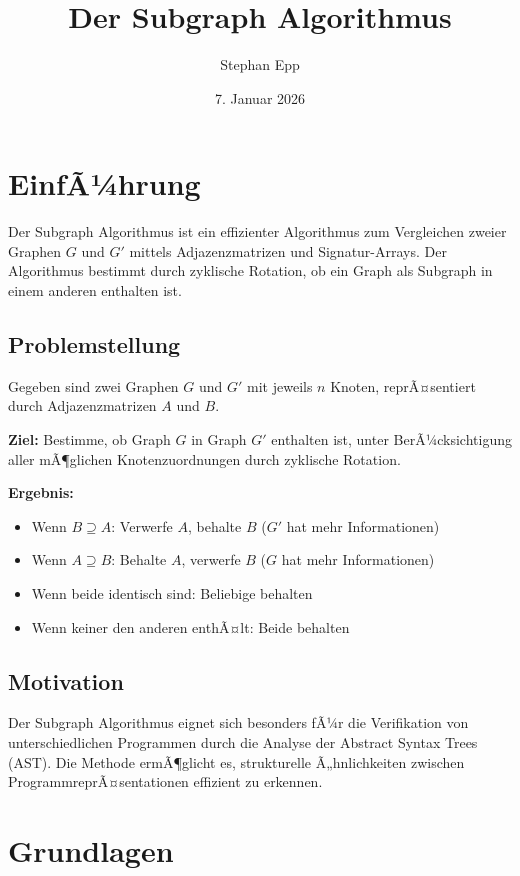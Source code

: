 ﻿\documentclass[a4paper,12pt]{article}
\title{Der Subgraph Algorithmus}
\author{Stephan Epp}
\date{7. Januar 2026}
\theoremstyle{definition}
\begin{document}
	
\maketitle

\tableofcontents
\newpage

\section{EinfÃ¼hrung}

Der Subgraph Algorithmus ist ein effizienter Algorithmus zum Vergleichen zweier Graphen $G$ und $G'$ mittels Adjazenzmatrizen und Signatur-Arrays. Der Algorithmus bestimmt durch zyklische Rotation, ob ein Graph als Subgraph in einem anderen enthalten ist.

\subsection{Problemstellung}

Gegeben sind zwei Graphen $G$ und $G'$ mit jeweils $n$ Knoten, reprÃ¤sentiert durch Adjazenzmatrizen $A$ und $B$.

\textbf{Ziel:} Bestimme, ob Graph $G$ in Graph $G'$ enthalten ist, unter BerÃ¼cksichtigung aller mÃ¶glichen Knotenzuordnungen durch zyklische Rotation.

\textbf{Ergebnis:}
\begin{itemize}
	\item Wenn $B \supseteq A$: Verwerfe $A$, behalte $B$ ($G'$ hat mehr Informationen)
	\item Wenn $A \supseteq B$: Behalte $A$, verwerfe $B$ ($G$ hat mehr Informationen)
	\item Wenn beide identisch sind: Beliebige behalten
	\item Wenn keiner den anderen enthÃ¤lt: Beide behalten
\end{itemize}

\subsection{Motivation}

Der Subgraph Algorithmus eignet sich besonders fÃ¼r die Verifikation von unterschiedlichen Programmen durch die Analyse der Abstract Syntax Trees (AST). Die Methode ermÃ¶glicht es, strukturelle Ã„hnlichkeiten zwischen ProgrammreprÃ¤sentationen effizient zu erkennen.

\section{Grundlagen}
\end{document}
